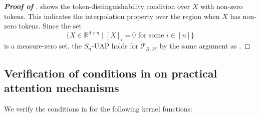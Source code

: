 \documentclass{article}
\begin{document}
\begin{proof}[\textbf{Proof of }]
     shows the token-distinguishability condition over $X$ with non-zero tokens.
    This indicates the interpolation property over the region when $X$ has non-zero tokens.
    Since the set
    \begin{equation}
        \{X\in\mathbb R^{d\times n}\mid [X]_i=0 \text{ for some } i\in [n]\}
    \end{equation}
    is a measure-zero set, the $S_n$-UAP holds for $\mathcal T_{\mathcal G,\mathcal H}$ by the same argument as .
\end{proof}


\subsection{Verification of conditions in  on practical attention mechanisms}
\label{sec:verify}
We verify the conditions in  for the following kernel functions:
\end{document}
